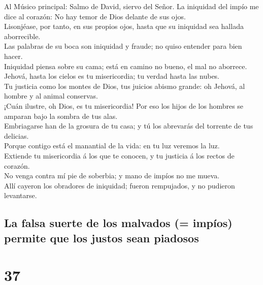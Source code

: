  Al Músico principal: Salmo de David, siervo del Señor. La
iniquidad del impío me dice al corazón: No hay temor de Dios delante de
sus ojos.\\
 Lisonjéase, por tanto, en sus propios ojos, hasta que su
iniquidad sea hallada aborrecible.\\
 Las palabras de su boca son iniquidad y fraude; no quiso
entender para bien hacer.\\
 Iniquidad piensa sobre su cama; está en camino no bueno,
el mal no aborrece.\\
 Jehová, hasta los cielos es tu misericordia; tu verdad
hasta las nubes.\\
 Tu justicia como los montes de Dios, tus juicios abismo
grande: oh Jehová, al hombre y al animal conservas.\\
 ¡Cuán ilustre, oh Dios, es tu misericordia! Por eso los
hijos de los hombres se amparan bajo la sombra de tus alas.\\
 Embriagarse han de la grosura de tu casa; y tú los
abrevarás del torrente de tus delicias.\\
 Porque contigo está el manantial de la vida: en tu luz
veremos la luz.\\
 Extiende tu misericordia á los que te conocen, y tu
justicia á los rectos de corazón.\\
 No venga contra mí pie de soberbia; y mano de impíos no
me mueva.\\
 Allí cayeron los obradores de iniquidad; fueron
rempujados, y no pudieron levantarse.

\hypertarget{la-falsa-suerte-de-los-malvados-impuxedos-permite-que-los-justos-sean-piadosos}{%
\subsection{La falsa suerte de los malvados (= impíos) permite que los
justos sean
piadosos}\label{la-falsa-suerte-de-los-malvados-impuxedos-permite-que-los-justos-sean-piadosos}}

\hypertarget{section-19-37}{%
\section{37}\label{section-19-37}}

